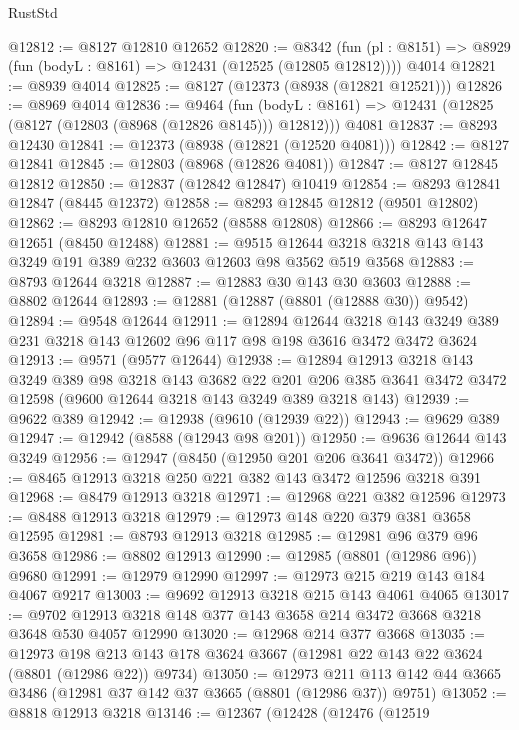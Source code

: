 \begin{lexlean}{RustStd}
\begin{coremodule}
@12812 := @8127 @12810 @12652
@12820 := @8342
    (fun (pl : @8151) => @8929 (fun (bodyL : @8161) => @12431 (@12525 (@12805 @12812))))
    @4014
@12821 := @8939 @4014
@12825 := @8127 (@12373 (@8938 (@12821 @12521)))
@12826 := @8969 @4014
@12836 := @9464
    (fun (bodyL : @8161) => @12431 (@12825 (@8127 (@12803 (@8968 (@12826 @8145))) @12812)))
    @4081
@12837 := @8293 @12430
@12841 := @12373 (@8938 (@12821 (@12520 @4081)))
@12842 := @8127 @12841
@12845 := @12803 (@8968 (@12826 @4081))
@12847 := @8127 @12845 @12812
@12850 := @12837 (@12842 @12847) @10419
@12854 := @8293 @12841 @12847 (@8445 @12372)
@12858 := @8293 @12845 @12812 (@9501 @12802)
@12862 := @8293 @12810 @12652 (@8588 @12808)
@12866 := @8293 @12647 @12651 (@8450 @12488)
@12881 := @9515 @12644 @3218 @3218 @143 @143 @3249 @191 @389 @232 @3603 @12603 @98 @3562 @519 @3568
@12883 := @8793 @12644 @3218
@12887 := @12883 @30 @143 @30 @3603
@12888 := @8802 @12644
@12893 := @12881 (@12887 (@8801 (@12888 @30)) @9542)
@12894 := @9548 @12644
@12911 := @12894
    @12644
    @3218
    @143
    @3249
    @389
    @231
    @3218
    @143
    @12602
    @96
    @117
    @98
    @198
    @3616
    @3472
    @3472
    @3624
@12913 := @9571 (@9577 @12644)
@12938 := @12894
    @12913
    @3218
    @143
    @3249
    @389
    @98
    @3218
    @143
    @3682
    @22
    @201
    @206
    @385
    @3641
    @3472
    @3472
    @12598
    (@9600 @12644 @3218 @143 @3249 @389 @3218 @143)
@12939 := @9622 @389
@12942 := @12938 (@9610 (@12939 @22))
@12943 := @9629 @389
@12947 := @12942 (@8588 (@12943 @98 @201))
@12950 := @9636 @12644 @143 @3249
@12956 := @12947 (@8450 (@12950 @201 @206 @3641 @3472))
@12966 := @8465 @12913 @3218 @250 @221 @382 @143 @3472 @12596 @3218 @391
@12968 := @8479 @12913 @3218
@12971 := @12968 @221 @382 @12596
@12973 := @8488 @12913 @3218
@12979 := @12973 @148 @220 @379 @381 @3658 @12595
@12981 := @8793 @12913 @3218
@12985 := @12981 @96 @379 @96 @3658
@12986 := @8802 @12913
@12990 := @12985 (@8801 (@12986 @96)) @9680
@12991 := @12979 @12990
@12997 := @12973 @215 @219 @143 @184 @4067 @9217
@13003 := @9692 @12913 @3218 @215 @143 @4061 @4065
@13017 := @9702 @12913 @3218 @148 @377 @143 @3658 @214 @3472 @3668 @3218 @3648 @530 @4057 @12990
@13020 := @12968 @214 @377 @3668
@13035 := @12973
    @198
    @213
    @143
    @178
    @3624
    @3667
    (@12981 @22 @143 @22 @3624 (@8801 (@12986 @22)) @9734)
@13050 := @12973
    @211
    @113
    @142
    @44
    @3665
    @3486
    (@12981 @37 @142 @37 @3665 (@8801 (@12986 @37)) @9751)
@13052 := @8818 @12913 @3218
@13146 := @12367
    (@12428
      (@12476
        (@12519

\end{coremodule}
\end{lexlean}
